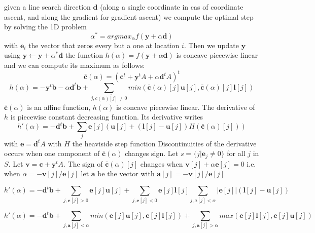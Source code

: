 \documentclass[11pt]{article}
\begin{document}
given a line search direction $\mathbf{d}$ (along a single coordinate in cas of coordinate ascent, and along the gradient for gradient ascent) we compute the optimal step by solving the 1D problem
\begin{equation}
\alpha^*=argmax_\alpha f(\mathbf{y}+\alpha \mathbf{d})
\end{equation}
with $\mathbf{e}_i$ the vector that zeros every but a one at location $i$.
Then we update $\mathbf{y}$ using $\mathbf{y}\leftarrow \mathbf{y}+\alpha^* \mathbf{d}$
the function $h(\alpha)=f(\mathbf{y}+\alpha \mathbf{d})$ is concave piecewise linear
and we can compute its maximum as follows:
\begin{equation}
\bar{\mathbf{c}}(\alpha)=(\mathbf{c}^t+\mathbf{y}^tA+\alpha \mathbf{d}^tA)^t
\end{equation}
\begin{equation}
h(\alpha)=-\mathbf{y}^t\mathbf{b}-\alpha \mathbf{d}^t\mathbf{b}+\sum_{j,\bar{c(\alpha)[j]\neq 0}} min(\bar{\mathbf{c}}(\alpha)[j]\mathbf{u}[j],\bar{\mathbf{c}}(\alpha)[j]\mathbf{l}[j])
\end{equation}
$\bar{\mathbf{c}}(\alpha)$ is an affine function,
$h(\alpha)$ is concave  piecewise linear. The derivative of $h$ is piecewise constant decreasing function. Its derivative writes
\begin{equation}
h'(\alpha)=-\mathbf{d}^t\mathbf{b}+ \sum_j \mathbf{e}[j](\mathbf{u}[j]+(\mathbf{l}[j]-\mathbf{u}[j])H(\mathbf{\bar{c}}(\alpha)[j]))
\end{equation} 
with $\mathbf{e}=\mathbf{d}^tA$
with $H$ the heaviside step function
Discontinuities of the derivative occurs when one component of $\bar{\mathbf{c}}(\alpha)$  changes sign. 
Let $s=\{j|\mathbf{e}_{j}\neq 0\}$ 
for all $j$ in $S$. Let $\mathbf{v}=\mathbf{c}+\mathbf{y}^tA$.
The sign of 
 $\bar{\mathbf{c}}(\alpha)[j]$ changes  when 
$ \mathbf{v}[j]+\alpha\mathbf{e}[j]=0$ i.e. when
$\alpha= -\mathbf{v}[j]/ \mathbf{e}[j]$ 
 let $\mathbf{a}$ be the vector with $\mathbf a[j]=-\mathbf{v}[j]/ \mathbf{e}[j]$

\begin{equation}
h'(\alpha)=-\mathbf{d}^t\mathbf{b}+ \sum_{j,\mathbf{e}[j]>0} \mathbf{e}[j] \mathbf{u}[j]+\sum_{j,\mathbf{e}[j]<0} \mathbf{e}[j]  \mathbf{l}[j]\sum_{j,a[j]<\alpha}|\mathbf{e}[j]|(\mathbf{l}[j]-\mathbf{u}[j])
\end{equation}

\begin{equation}
h'(\alpha)=-\mathbf{d}^t\mathbf{b}+ \sum_{j,\mathbf{a}[j]<\alpha}min(\mathbf{e}[j]\mathbf{u}[j],\mathbf{e}[j]\mathbf{l}[j])+
\sum_{j,\mathbf{a}[j]>\alpha}max(\mathbf{e}[j]\mathbf{l}[j],\mathbf{e}[j]\mathbf{u}[j])
\end{equation}
\end{document}
